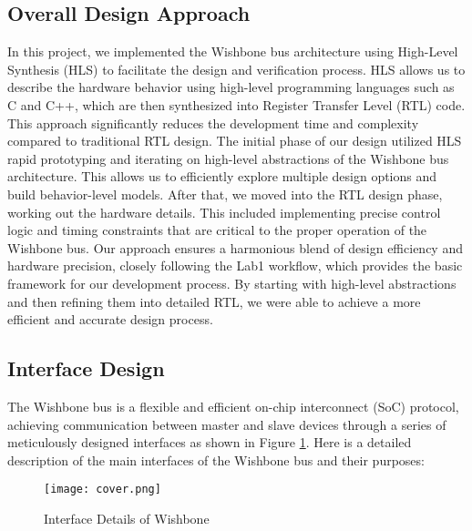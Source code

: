 \documentclass[conference]{IEEEtran}
\begin{document}
\subsection{Overall Design Approach}

In this project, we implemented the Wishbone bus architecture using High-Level Synthesis (HLS) to facilitate the design and verification process. HLS allows us to describe the hardware behavior using high-level programming languages such as C and C++, which are then synthesized into Register Transfer Level (RTL) code. This approach significantly reduces the development time and complexity compared to traditional RTL design. The initial phase of our design utilized HLS rapid prototyping and iterating on high-level abstractions of the Wishbone bus architecture. This allows us to efficiently explore multiple design options and build behavior-level models. After that, we moved into the RTL design phase, working out the hardware details. This included implementing precise control logic and timing constraints that are critical to the proper operation of the Wishbone bus. Our approach ensures a harmonious blend of design efficiency and hardware precision, closely following the Lab1 workflow, which provides the basic framework for our development process. By starting with high-level abstractions and then refining them into detailed RTL, we were able to achieve a more efficient and accurate design process.


\subsection{Interface Design}
The Wishbone bus is a flexible and efficient on-chip interconnect (SoC) protocol, achieving communication between master and slave devices through a series of meticulously designed interfaces as shown in Figure \ref{interface}. Here is a detailed description of the main interfaces of the Wishbone bus and their purposes:

\begin{figure}[h]
    \centering
    \texttt{[image: cover.png]}
    \caption{Interface Details of Wishbone}
    \label{interface}
\end{figure}
\end{document}
